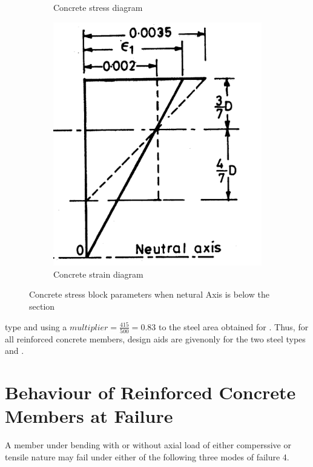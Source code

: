 \begin{figure}
\begin{subfigure}{0.3\textwidth}
\caption{Concrete stress diagram}
\label{fig:sec}
\end{subfigure}
%
\begin{subfigure}{0.3\textwidth}
\centering
\includegraphics[width=\textwidth]{images/conretestraiinc.png}
\caption{Concrete strain diagram}
\label{fig:con}
\end{subfigure}
\caption{Concrete stress block parameters when netural Axis is below the section}
\label{fig:block}
\end{figure}

type {\fefouronefive} and using a $multiplier=\frac{415}{500} = 0.83$ to the steel
area obtained for {\fefouronefive}. Thus, for all reinforced concrete members,
design aids are givenonly for the two steel types {\fetwofivezero} and
{\fefouronefive}.

\section{Behaviour of Reinforced Concrete Members at Failure}

A member under bending with or without axial load of either comperssive
or tensile nature may fail under either of the following three modes of
failure 4.

